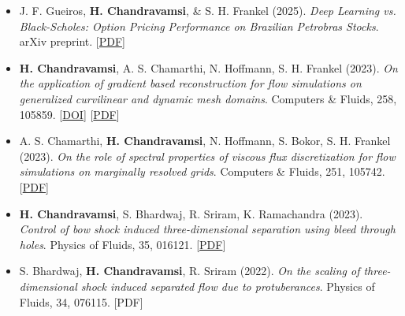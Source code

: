 \begin{itemize}[itemsep=0pt, topsep=0pt, label=]
    \item J. F. Gueiros, \textbf{H. Chandravamsi}, \& S. H. Frankel (2025). \textit{Deep Learning vs. Black-Scholes: Option Pricing Performance on Brazilian Petrobras Stocks}. arXiv preprint. [\href{https://arxiv.org/pdf/2504.20088}{PDF}]
\end{itemize}

\begin{itemize}[itemsep=0pt, topsep=0pt, label=]
    \item \textbf{H. Chandravamsi}, A. S. Chamarthi, N. Hoffmann, S. H. Frankel (2023). \textit{On the application of gradient based reconstruction for flow simulations on generalized curvilinear and dynamic mesh domains}. Computers \& Fluids, 258, 105859. [\href{https://www.sciencedirect.com/science/article/abs/pii/S0045793023000841?via%3Dihub}{DOI}] [\href{https://arxiv.org/pdf/2303.10785}{PDF}]
\end{itemize}

\begin{itemize}[itemsep=0pt, topsep=0pt, label=]
    \item A. S. Chamarthi, \textbf{H. Chandravamsi}, N. Hoffmann, S. Bokor, S. H. Frankel (2023). \textit{On the role of spectral properties of viscous flux discretization for flow simulations on marginally resolved grids}. Computers \& Fluids, 251, 105742. [\href{https://arxiv.org/pdf/2206.14891}{PDF}]
\end{itemize}

\begin{itemize}[itemsep=0pt, topsep=0pt, label=]
    \item \textbf{H. Chandravamsi}, S. Bhardwaj, R. Sriram, K. Ramachandra (2023). \textit{Control of bow shock induced three-dimensional separation using bleed through holes}. Physics of Fluids, 35, 016121. [\href{https://arxiv.org/pdf/2211.12214}{PDF}]
\end{itemize}

\begin{itemize}[itemsep=0pt, topsep=0pt, label=]
    \item S. Bhardwaj, \textbf{H. Chandravamsi}, R. Sriram (2022). \textit{On the scaling of three-dimensional shock induced separated flow due to protuberances}. Physics of Fluids, 34, 076115. [PDF]
\end{itemize}

